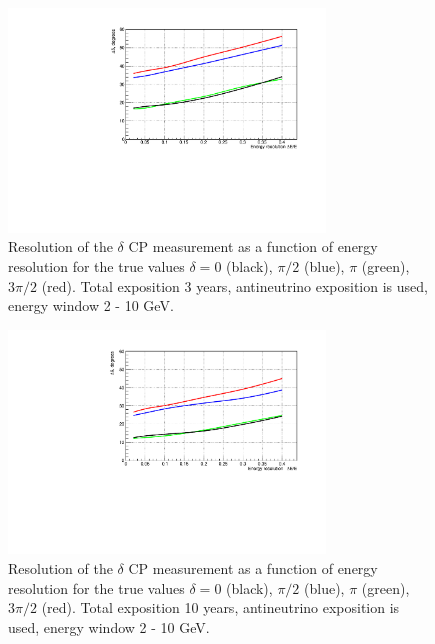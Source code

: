 \documentclass[prd,showpacs,groupedaddress,superscriptaddress,amsmath,amssymb]{revtex4-2} %
\begin{document}
\begin{figure}[h]
\begin{center}
\includegraphics[width=0.75\textwidth]{del_delres_eres_anu.pdf}
\caption {Resolution of the $\delta$ CP measurement as a function of energy resolution for the true values $\delta = 0$ (black), $\pi/2$ (blue),
$\pi$ (green), $3\pi/2$ (red). Total exposition 3 years, antineutrino exposition is used, energy window 2 - 10 GeV.
\label{fig:del_delres_eres_anu}}
\end{center}
\end{figure}

\begin{figure}[h]
\begin{center}
\includegraphics[width=0.75\textwidth]{del_delres_eres_anu10.pdf}
\caption {Resolution of the $\delta$ CP measurement as a function of energy resolution for the true values $\delta = 0$ (black), $\pi/2$ (blue),
$\pi$ (green), $3\pi/2$ (red). Total exposition 10 years, antineutrino exposition is used, energy window 2 - 10 GeV.
\label{fig:del_delres_eres_anu10}}
\end{center}
\end{figure}
\end{document}
